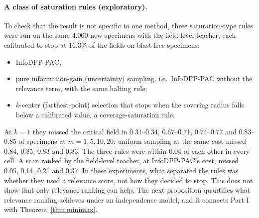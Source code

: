 \documentclass[11pt]{article}
\theoremstyle{remark}
\theoremstyle{definition}
\begin{document}
\paragraph{A class of saturation rules (exploratory).} To check that the result is not specific to one method, three saturation-type rules were run on the same 4,000 new specimens with the field-level teacher, each calibrated to stop at 16.3\% of the fields on blast-free specimens:
\begin{itemize}
\item InfoDPP-PAC;
\item pure information-gain (uncertainty) sampling, i.e.\ InfoDPP-PAC without the relevance term, with the same halting rule;
\item $k$-center (farthest-point) selection that stops when the covering radius falls below a calibrated value, a coverage-saturation rule.
\end{itemize}
At $k=1$ they missed the critical field in 0.31--0.34, 0.67--0.71, 0.74--0.77 and 0.83--0.85 of specimens at $m=1,5,10,20$; uniform sampling at the same cost missed 0.84, 0.85, 0.83 and 0.83. The three rules were within 0.04 of each other in every cell. A scan ranked by the field-level teacher, at InfoDPP-PAC's cost, missed 0.05, 0.14, 0.21 and 0.37. In these experiments, what separated the rules was whether they used a relevance score, not how they decided to stop. This does not show that only relevance ranking can help. The next proposition quantifies what relevance ranking achieves under an independence model, and it connects Part I with Theorem~\ref{thm:minimax}.
\end{document}
